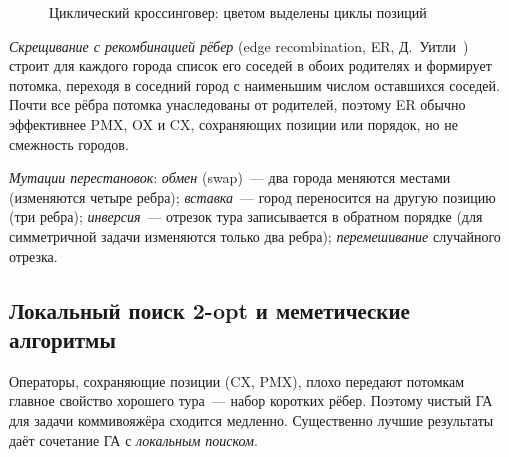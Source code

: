 \begin{figure}[!htb]
\centering
{}
\caption{Циклический кроссинговер: цветом выделены циклы позиций}
\label{fig:cx}
\end{figure}

\emph{Скрещивание с рекомбинацией рёбер} (edge recombination, ER, Д.~Уитли~\cite{whitley1989}) строит
для каждого города список его соседей в обоих родителях и формирует потомка, переходя в соседний город
с наименьшим числом оставшихся соседей. Почти все рёбра потомка унаследованы от родителей, поэтому ER
обычно эффективнее PMX, OX и CX, сохраняющих позиции или порядок, но не смежность городов.

\emph{Мутации перестановок}: \emph{обмен} (swap)~--- два города меняются местами (изменяются четыре
ребра); \emph{вставка}~--- город переносится на другую позицию (три ребра); \emph{инверсия}~--- отрезок
тура записывается в обратном порядке (для симметричной задачи изменяются только два ребра);
\emph{перемешивание} случайного отрезка.

\subsection{Локальный поиск 2-opt и меметические алгоритмы}

Операторы, сохраняющие позиции (CX, PMX), плохо передают потомкам главное свойство хорошего тура~---
набор коротких рёбер. Поэтому чистый ГА для задачи коммивояжёра сходится медленно. Существенно
лучшие результаты даёт сочетание ГА с \emph{локальным поиском}.

